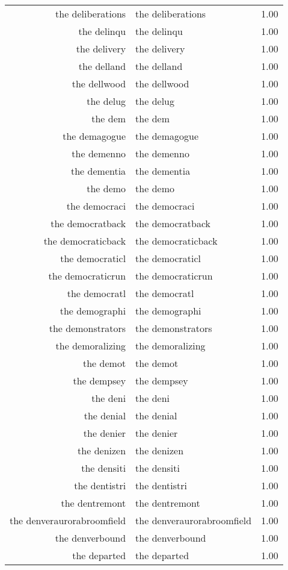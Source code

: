 \begin{table}[ht]
\begin{tabular}{rlr}
  the deliberations & the deliberations & 1.00 \\ 
  the delinqu & the delinqu & 1.00 \\ 
  the delivery & the delivery & 1.00 \\ 
  the delland & the delland & 1.00 \\ 
  the dellwood & the dellwood & 1.00 \\ 
  the delug & the delug & 1.00 \\ 
  the dem & the dem & 1.00 \\ 
  the demagogue & the demagogue & 1.00 \\ 
  the demenno & the demenno & 1.00 \\ 
  the dementia & the dementia & 1.00 \\ 
  the demo & the demo & 1.00 \\ 
  the democraci & the democraci & 1.00 \\ 
  the democratback & the democratback & 1.00 \\ 
  the democraticback & the democraticback & 1.00 \\ 
  the democraticl & the democraticl & 1.00 \\ 
  the democraticrun & the democraticrun & 1.00 \\ 
  the democratl & the democratl & 1.00 \\ 
  the demographi & the demographi & 1.00 \\ 
  the demonstrators & the demonstrators & 1.00 \\ 
  the demoralizing & the demoralizing & 1.00 \\ 
  the demot & the demot & 1.00 \\ 
  the dempsey & the dempsey & 1.00 \\ 
  the deni & the deni & 1.00 \\ 
  the denial & the denial & 1.00 \\ 
  the denier & the denier & 1.00 \\ 
  the denizen & the denizen & 1.00 \\ 
  the densiti & the densiti & 1.00 \\ 
  the dentistri & the dentistri & 1.00 \\ 
  the dentremont & the dentremont & 1.00 \\ 
  the denveraurorabroomfield & the denveraurorabroomfield & 1.00 \\ 
  the denverbound & the denverbound & 1.00 \\ 
  the departed & the departed & 1.00 \\ 

\end{tabular}
\end{table}
